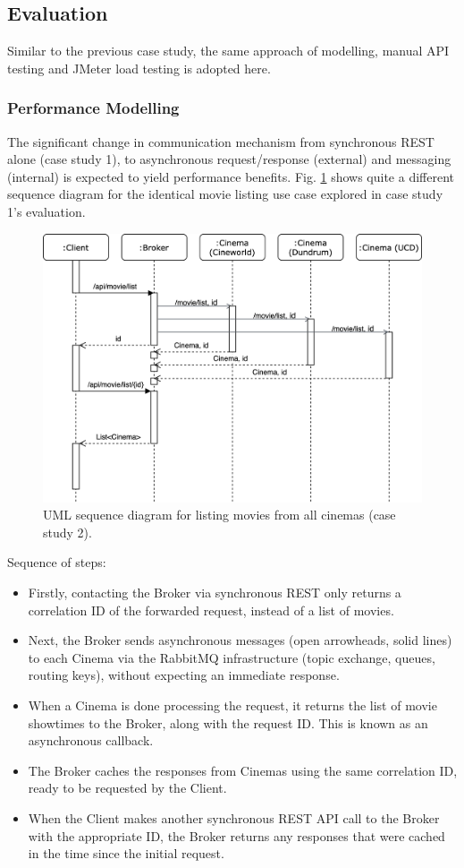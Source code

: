\subsection{Evaluation}

Similar to the previous case study, the same approach of modelling, manual API testing and JMeter load testing is adopted here.

\subsubsection{Performance Modelling}

The significant change in communication mechanism from synchronous REST alone (case study 1), to asynchronous request/response (external) and messaging (internal) is expected to yield performance benefits. Fig. \ref{fig:cs02-sequence} shows quite a different sequence diagram for the identical movie listing use case explored in case study 1's evaluation.

\begin{figure}[H]
  \centering
  \includegraphics[width=0.75\linewidth]{./assets/diagrams/cs02-sequence.png}
  \caption{UML sequence diagram for listing movies from all cinemas (case study 2).}
  \label{fig:cs02-sequence}
\end{figure}

Sequence of steps:
\begin{itemize}
  \item Firstly, contacting the Broker via synchronous REST only returns a correlation ID of the forwarded request, instead of a list of movies.
  \item Next, the Broker sends asynchronous messages (open arrowheads, solid lines) to each Cinema via the RabbitMQ infrastructure (topic exchange, queues, routing keys), without expecting an immediate response.
  \item When a Cinema is done processing the request, it returns the list of movie showtimes to the Broker, along with the request ID. This is known as an asynchronous callback.
  \item The Broker caches the responses from Cinemas using the same correlation ID, ready to be requested by the Client.
  \item When the Client makes another synchronous REST API call to the Broker with the appropriate ID, the Broker returns any responses that were cached in the time since the initial request.
\end{itemize}

